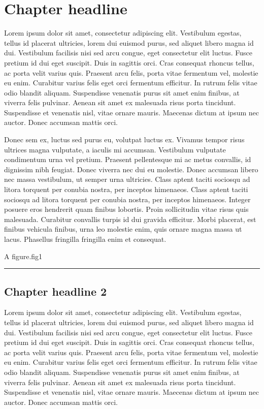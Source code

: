 \documentclass{thesis}
\begin{document}
\maketableofcontents

\section{Chapter headline}
Lorem ipsum dolor sit amet, consectetur adipiscing elit. Vestibulum egestas, tellus id placerat ultricies, lorem dui euismod purus, sed aliquet libero magna id dui. Vestibulum facilisis nisi sed arcu congue, eget consectetur elit luctus. Fusce pretium id dui eget suscipit. Duis in sagittis orci. Cras consequat rhoncus tellus, ac porta velit varius quis. Praesent arcu felis, porta vitae fermentum vel, molestie eu enim. Curabitur varius felis eget orci fermentum efficitur. In rutrum felis vitae odio blandit aliquam. Suspendisse venenatis purus sit amet enim finibus, at viverra felis pulvinar. Aenean sit amet ex malesuada risus porta tincidunt. Suspendisse et venenatis nisl, vitae ornare mauris. Maecenas dictum at ipsum nec auctor. Donec accumsan mattis orci.

Donec sem ex, luctus sed purus eu, volutpat luctus ex. Vivamus tempor risus ultrices magna vulputate, a iaculis mi accumsan. Vestibulum vulputate condimentum urna vel pretium. Praesent pellentesque mi ac metus convallis, id dignissim nibh feugiat. Donec viverra nec dui eu molestie. Donec accumsan libero nec massa vestibulum, ut semper urna ultricies. Class aptent taciti sociosqu ad litora torquent per conubia nostra, per inceptos himenaeos. Class aptent taciti sociosqu ad litora torquent per conubia nostra, per inceptos himenaeos. Integer posuere eros hendrerit quam finibus lobortis. Proin sollicitudin vitae risus quis malesuada. Curabitur convallis turpis id dui gravida efficitur. Morbi placerat, est finibus vehicula finibus, urna leo molestie enim, quis ornare magna massa ut lacus. Phasellus fringilla fringilla enim et consequat.

\begin{thesisfigure}{A figure.}{fig1}
\rule{1cm}{1cm}%
\end{thesisfigure}

\subsection{Chapter headline 2}
Lorem ipsum dolor sit amet, consectetur adipiscing elit. Vestibulum egestas, tellus id placerat ultricies, lorem dui euismod purus, sed aliquet libero magna id dui. Vestibulum facilisis nisi sed arcu congue, eget consectetur elit luctus. Fusce pretium id dui eget suscipit. Duis in sagittis orci. Cras consequat rhoncus tellus, ac porta velit varius quis. Praesent arcu felis, porta vitae fermentum vel, molestie eu enim. Curabitur varius felis eget orci fermentum efficitur. In rutrum felis vitae odio blandit aliquam. Suspendisse venenatis purus sit amet enim finibus, at viverra felis pulvinar. Aenean sit amet ex malesuada risus porta tincidunt. Suspendisse et venenatis nisl, vitae ornare mauris. Maecenas dictum at ipsum nec auctor. Donec accumsan mattis orci. 
\end{document}
